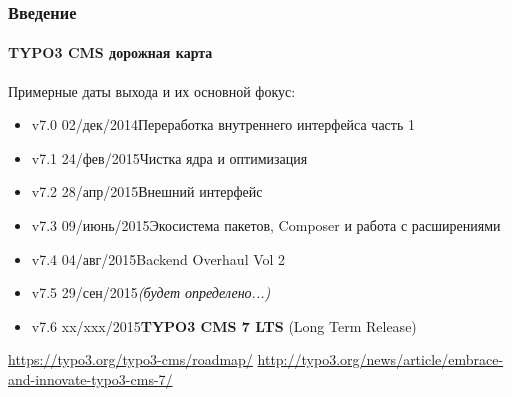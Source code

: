 \begin{frame}[fragile]
	\frametitle{Введение}
	\framesubtitle{TYPO3 CMS дорожная карта}

	Примерные даты выхода и их основной фокус:

	\begin{itemize}
			\item v7.0 \tabto{1.0cm}02/дек/2014\tabto{3.4cm}Переработка внутреннего интерфейса часть 1
		\item v7.1 \tabto{1.0cm}24/фев/2015\tabto{3.4cm}Чистка ядра и оптимизация

		\item
			\begingroup
				\color{typo3orange}
					v7.2 \tabto{1.0cm}28/апр/2015\tabto{3.4cm}Внешний интерфейс
			\endgroup

		\item v7.3 \tabto{1.0cm}09/июнь/2015\tabto{3.4cm}Экосистема пакетов, Composer\newline
			\tabto{3.4cm}и работа с расширениями
		\item v7.4 \tabto{1.0cm}04/авг/2015\tabto{3.4cm}Backend Overhaul Vol 2
		\item v7.5 \tabto{1.0cm}29/сен/2015\tabto{3.4cm}\textit{(будет определено...)}
		\item v7.6 \tabto{1.0cm}xx/xxx/2015\tabto{3.4cm}\textbf{TYPO3 CMS 7 LTS} (Long Term Release)
	\end{itemize}

	\smaller
		\url{https://typo3.org/typo3-cms/roadmap/}\newline
		\url{http://typo3.org/news/article/embrace-and-innovate-typo3-cms-7/}
	\normalsize

\end{frame}

